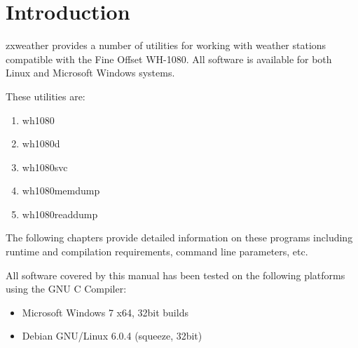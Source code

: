 \documentclass[a4paper,10pt,draft]{book}
\newcommand{\partnumber}{\ifthenelse{\isundefined{\projectnum}}{}{\projectnum-\docnum	\ifthenelse{\equal{\docrev}{001}}{}{.\docrev}}}
\begin{document}

\ifthenelse{\isundefined{\ordernumber}}{

\title{\doctitle{} - \docsubtitle}
\author{\docauthor}
}{

\title{\doctitle}
\subtitle{\docsubtitle}
\titleabstract{\docabstract}
\ordernumber{\partnumber}
\updateinfo{\docupdateinfo}
\osinfo{\docosver}
\swversion{\docswver}
\titlecopyright{\doccopyright}
\licensestatement{\doclicense}
}
\date{\docdate}

\maketitle

\clearpage

\tableofcontents
\clearpage


\chapter{Introduction}
\setcounter{page}{1}

zxweather provides a number of utilities for working with weather stations compatible with the Fine Offset WH-1080. All software is available for both Linux and Microsoft Windows systems.

These utilities are:
\begin{enumerate}
\item wh1080
\item wh1080d
\item wh1080svc
\item wh1080memdump
\item wh1080readdump
\end{enumerate}

The following chapters provide detailed information on these programs including runtime and compilation requirements, command line parameters, etc.

All software covered by this manual has been tested on the following platforms using the GNU C Compiler:
\begin{itemize}
\item Microsoft Windows 7 x64, 32bit builds
\item Debian GNU/Linux 6.0.4 (squeeze, 32bit)
\end{itemize}
\end{document}
